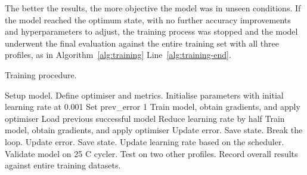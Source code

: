 The better the results, the more objective the model was in unseen conditions.
If the model reached the optimum state, with no further accuracy improvements and hyperparameters to adjust, the training process was stopped and the model underwent the final evaluation against the entire training set with all three profiles, as in Algorithm~\ref{alg:training} Line~\ref{alg:training-end}.
\begin{algorithm}[H]%
    \caption{Training procedure.}
    \begin{algorithmic}[1]
        \STATE Setup model. Define optimiser and metrics.
        \STATE Initialise parameters with initial learning rate at 0.001
        \STATE Set prev\_error 1
            \STATE Train model, obtain gradients, and apply optimiser
              \label{alg:training-check}
                    \STATE Load previous successful model \label{alg:training-recovery-start}
                    \STATE Reduce learning rate by half
                    \STATE Train model, obtain gradients, and apply optimiser
                        \STATE Update error. Save state. Break the loop. \label{alg:training-recovery-end}
                    \ENDIF
                \ENDWHILE
            \ELSE
                \STATE Update error. Save state. \label{alg:training-succes}
            \ENDIF
            \STATE Update learning rate based on the scheduler.
            \STATE Validate model on 25 \textdegree{}C cycler. \label{alg:training-valid}
            \STATE Test on two other profiles. \label{alg:training-test}
        \ENDWHILE
        \STATE Record overall results against entire training datasets. \label{alg:training-end}
    \end{algorithmic}
    \label{alg:training}
\end{algorithm}

